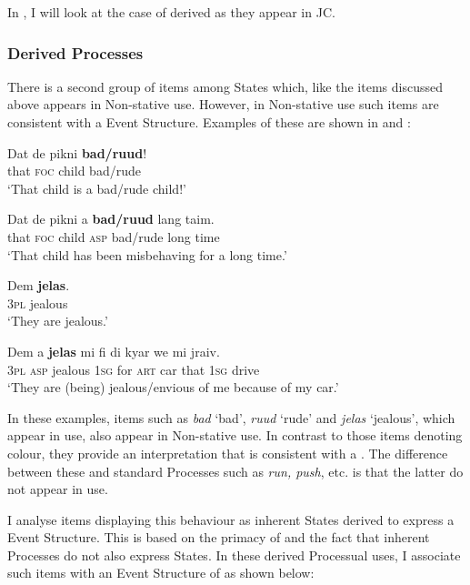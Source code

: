 In , I will look at the case of derived  as they appear in JC.

\subsubsection{Derived Processes}\label{sec:5.2.3.2}

There is a second group of items among States which, like the  items discussed above appears in Non-stative use. However, in Non-stative use such items are consistent with a  Event Structure. Examples of these are shown in  and : 

\ea%
 \label{ex:5:25}
\ea 
\gll Dat de pikni \textbf{bad/ruud}!\\
that \textsc{foc} child bad/rude\\
\glt `That child is a bad\slash rude child!'

\ex 
\gll Dat de pikni a \textbf{bad/ruud} lang taim.\\
 that \textsc{foc} child \textsc{asp} bad/rude long time\\
\glt `That child has been misbehaving for a long time.'
 \z
\z

\ea%
\label{ex:5:26}
\ea
\gll Dem \textbf{jelas}.\\
 \textsc{3pl} jealous \\
\glt `They are jealous.'

\ex 
\gll Dem a \textbf{jelas} mi fi di kyar we mi jraiv.\\ 
\textsc{3pl} \textsc{asp} jealous \textsc{1sg} for \textsc{art} car that \textsc{1sg} drive\\
\glt `They are (being) jealous\slash envious of me because of my car.'
\z
\z

In these examples, items such as \textit{bad} `bad', \textit{ruud} `rude' and \textit{jelas} `jealous', which appear in  use, also appear in Non-stative use. In contrast to those items denoting colour, they provide an interpretation that is consistent with a . The difference between these and standard Processes such as \textit{run, push}, etc. is that the latter do not appear in  use. 

I analyse items displaying this behaviour as inherent States derived to express a  Event Structure. This is based on the primacy of  \citep{Grimshaw1990} and the fact that inherent Processes do not also express States. In these derived Processual uses, I associate such items with an Event Structure of  as shown below:


